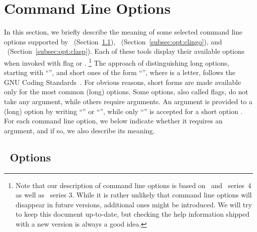 \section{Command Line Options}\label{sec:options}

In this section, we briefly describe the meaning of
some selected command line options supported by
\gringo\ (Section~\ref{subsec:opt:gringo}),
\clingo\ (Section~\ref{subsec:opt:clingo}), and
\clasp\ (Section~\ref{subsec:opt:clasp}).
Each of these tools display their available options
when invoked with flag  or .%
\footnote{%
  Note that our description of command line options
  is based on \gringo\ and \clingo\ series~4
  as well as \clasp\ series 3.
  While it is rather unlikely that command line options will
  disappear in future versions,
  additional ones might be introduced.
  We will try to keep this document up-to-date,
  but checking the help information shipped
  with a new version is always a good idea.}
The approach of distinguishing long options, starting with ``\code{--}'',
and short ones of the form ``'',
where  is a letter,
follows the GNU Coding Standards~\cite{GNUcoding}.
For obvious reasons,
short forms are made available only for the most common (long) options.
Some options, also called flags, do not take any argument,
while others require arguments.
An argument  is provided to a (long) option 
by writing
``'' or
``'',
while only
``''
is accepted for a short option .
For each command line option,
we below indicate whether it requires an argument,
and if so, we also describe its meaning.


\subsection{\gringo\ Options}\label{subsec:opt:gringo}

